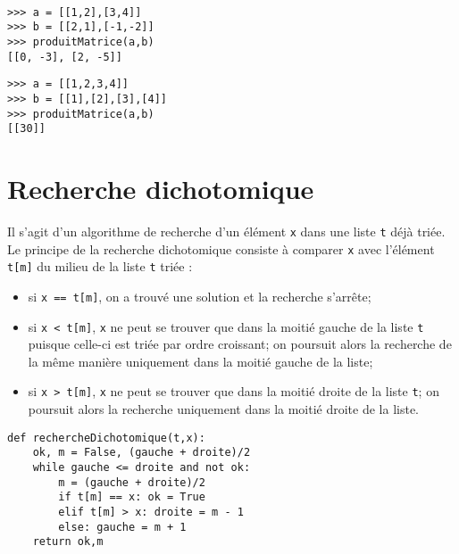 \mbox{}\ \ \begin{py}{8cm}
\begin{verbatim}
>>> a = [[1,2],[3,4]]
>>> b = [[2,1],[-1,-2]]
>>> produitMatrice(a,b)
[[0, -3], [2, -5]]
\end{verbatim}
\end{py}
\hfill
\begin{py}{5cm}
\begin{verbatim}
>>> a = [[1,2,3,4]]
>>> b = [[1],[2],[3],[4]]
>>> produitMatrice(a,b)
[[30]]
\end{verbatim}
\end{py}


\section*{Recherche dichotomique}
Il s'agit d'un algorithme de recherche d'un élément {\tt x} dans une liste {\tt t} déjà triée.
Le principe de la recherche dichotomique consiste à comparer {\tt x} avec l'élément
{\tt t[m]} du milieu de la liste {\tt t} triée :
\begin{itemize}
\item si {\tt x == t[m]}, on a trouvé une solution et la recherche s'arrête;
\item si {\tt x < t[m]}, {\tt x} ne peut se trouver que dans la moitié gauche de la liste {\tt t}
	puisque celle-ci est triée par ordre croissant; on poursuit alors la recherche
	de la même manière uniquement dans la moitié gauche de la liste;
\item si {\tt x > t[m]}, {\tt x} ne peut se trouver que dans la moitié droite de la liste {\tt t};
	on poursuit alors la recherche uniquement dans la moitié droite de la liste.
\end{itemize}

\begin{lstlisting}[caption={\bf Recherche dichotomique},label=cl:rechercheDichotomique]
def rechercheDichotomique(t,x):
    ok, m = False, (gauche + droite)/2
    while gauche <= droite and not ok:
        m = (gauche + droite)/2
        if t[m] == x: ok = True
        elif t[m] > x: droite = m - 1
        else: gauche = m + 1
    return ok,m
\end{lstlisting}

